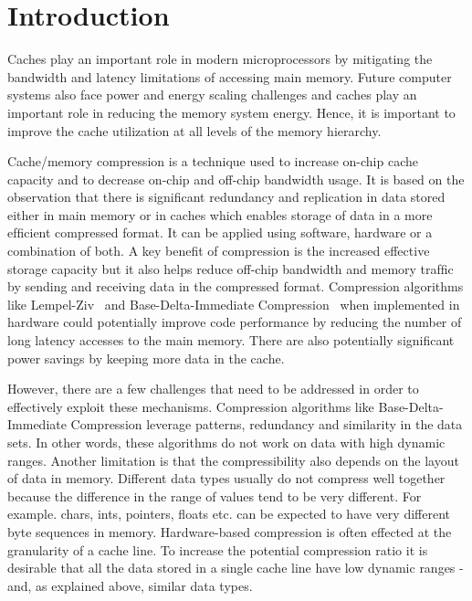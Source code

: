 \section{Introduction}
\label{sec:intro}

Caches play an important role in modern microprocessors by mitigating the
bandwidth and latency limitations of accessing main memory. Future computer
systems also face power and energy scaling challenges and caches play an
important role in reducing the memory system energy. Hence, it is important to
improve the cache utilization at all levels of the memory hierarchy. 

Cache/memory compression is a technique used to increase on-chip cache capacity
and to decrease on-chip and off-chip bandwidth usage. It is based on the
observation that there is signiﬁcant redundancy and replication in data stored
either in main memory or in caches which enables storage of data in a more
efﬁcient compressed format. It can be applied using software, hardware or a
combination of both. A key beneﬁt of compression is the increased effective
storage capacity but it also helps reduce off-chip bandwidth and memory trafﬁc
by sending and receiving data in the compressed format. Compression algorithms
like Lempel-Ziv~\cite{lemp-ziv} and Base-Delta-Immediate Compression~\cite{bdi} when implemented in
hardware could potentially improve code performance by reducing the number of
long latency accesses to the main memory. There are also potentially significant
power savings by keeping more data in the cache. 

However, there are a few challenges that need to be addressed in order to
effectively exploit these mechanisms. Compression algorithms like
Base-Delta-Immediate Compression leverage patterns, redundancy and similarity in
the data sets. In other words, these algorithms do not work on data with high
dynamic ranges. Another limitation is that the compressibility also depends on
the layout of data in memory. Different data types usually do not compress well
together because the difference in the range of values tend to be very
different. For example. chars, ints, pointers, floats etc. can be expected to
have very different byte sequences in memory. Hardware-based compression is
often effected at the granularity of a cache line. To increase the potential
compression ratio it is desirable that all the data stored in a single cache
line have low dynamic ranges - and, as explained above, similar data types. 

